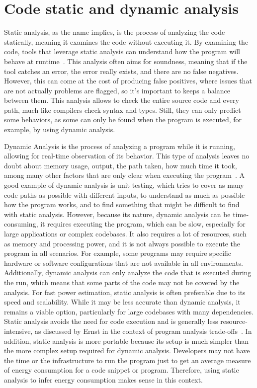 \section{Code static and dynamic analysis} \label{sec:background_static_dynamic_analysis}

Static analysis, as the name implies, is the process of analyzing the code statically, meaning it examines the code without executing it. By examining the code, tools that leverage static analysis can understand how the program will behave at runtime~\cite{ernst2003static}. This analysis often aims for soundness, meaning that if the tool catches an error, the error really exists, and there are no false negatives. However, this can come at the cost of producing false positives, where issues that are not actually problems are flagged, so it's important to keeps a balance between them. This analysis allows to check the entire source code and every path, much like compilers check syntax and types. Still, they can only predict some behaviors, as some can only be found when the program is executed, for example, by using dynamic analysis.

Dynamic Analysis is the process of analyzing a program while it is running, allowing for real-time observation of its behavior.  This type of analysis leaves no doubt about memory usage, output, the path taken, how much time it took, among many other factors that are only clear when executing the program~\cite{ernst2003static}. A good example of dynamic analysis is unit testing, which tries to cover as many code paths as possible with different inputs, to understand as much as possible how the program works, and to find something that might be difficult to find with static analysis. However, because its nature, dynamic analysis can be time-consuming, it requires executing the program, which can be slow, especially for large applications or complex codebases. It also requires a lot of resources, such as memory and processing power, and it is not always possible to execute the program in all scenarios. For example, some programs may require specific hardware or software configurations that are not available in all environments. Additionally, dynamic analysis can only analyze the code that is executed during the run, which means that some parts of the code may not be covered by the analysis.
For fast power estimation, static analysis is often preferable due to its speed and scalability. While it may be less accurate than dynamic analysis, it remains a viable option, particularly for large codebases with many dependencies. Static analysis avoids the need for code execution and is generally less resource-intensive, as discussed by Ernst in the context of program analysis trade-offs~\cite{ernst2003static}.
In addition, static analysis is more portable because its setup is much simpler than the more complex setup required for dynamic analysis.
Developers may not have the time or the infrastructure to run the program just to get an average measure of energy consumption for a code snippet or program. Therefore, using static analysis to infer energy consumption makes sense in this context.

